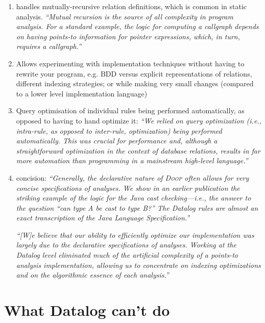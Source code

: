 \begin{enumerate}
\item handles mutually-recursive relation definitions, which is common in static
  analysis. \emph{``Mutual recursion is the source of all complexity in program
    analysis. For a standard example, the logic for computing a callgraph
    depends on having points-to information for pointer expressions, which, in
    turn, requires a callgraph.''}~\citep{DBLP:conf/datalog/SmaragdakisB10}

\item Allows experimenting with implementation techniques without having to rewrite your program, e.g. BDD versus explicit representations of relations, different indexing strategies; or while making very small changes (compared to a lower level implementation language)

\item Query optimisation of individual rules being performed automatically, as
  opposed to having to hand optimize it: \emph{``We relied on query optimization
    (i.e., intra-rule, as opposed to inter-rule, optimization) being performed
    automatically. This was crucial for performance and, although a
    straightforward optimization in the context of database relations, results
    in far more automation than programming in a mainstream high-level
    language.''}

\item concision: \emph{``Generally, the declarative nature of \textsc{Doop}
  often allows for very concise specifications of analyses. We show in an
  earlier publication the striking example of the logic for the Java cast
  checking---i.e., the answer to the question “can type A be cast to type B?”
  The Datalog rules are almost an exact transcription of the Java
  Language Specification.''}

  \emph{``[W]e believe that our ability to efficiently optimize our
    implementation was largely due to the declarative specifications of
    analyses. Working at the Datalog level eliminated much of the artificial
    complexity of a points-to analysis implementation, allowing us to
    concentrate on indexing optimizations and on the algorithmic essence of each
    analysis.''}
\end{enumerate}


\section{What Datalog can't do}

